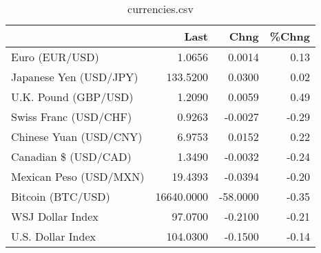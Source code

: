 \documentclass{article}%
\begin{document}
%


\begin{table}[htbp]%
\caption{currencies.csv}%
\centering%
\begin{adjustbox}{width=1\textwidth}%
\begin{tabular}{lrrr}
\toprule
                       &       Last &     Chng &  \%Chng \\
\midrule
        Euro (EUR/USD) &     1.0656 &   0.0014 &   0.13 \\
Japanese Yen (USD/JPY) &   133.5200 &   0.0300 &   0.02 \\
  U.K. Pound (GBP/USD) &     1.2090 &   0.0059 &   0.49 \\
 Swiss Franc (USD/CHF) &     0.9263 &  -0.0027 &  -0.29 \\
Chinese Yuan (USD/CNY) &     6.9753 &   0.0152 &   0.22 \\
  Canadian \$ (USD/CAD) &     1.3490 &  -0.0032 &  -0.24 \\
Mexican Peso (USD/MXN) &    19.4393 &  -0.0394 &  -0.20 \\
     Bitcoin (BTC/USD) & 16640.0000 & -58.0000 &  -0.35 \\
      WSJ Dollar Index &    97.0700 &  -0.2100 &  -0.21 \\
     U.S. Dollar Index &   104.0300 &  -0.1500 &  -0.14 \\
\bottomrule
\end{tabular}
%
\end{adjustbox}%
\end{table}

%
\end{document}
